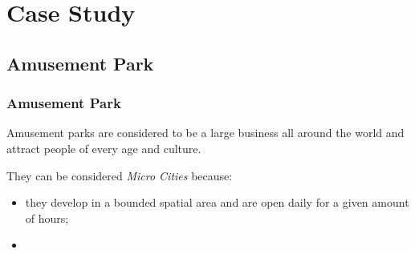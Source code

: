 \section{Case Study}\label{sec:case-study}
\frame{\tableofcontents[currentsection]}

\subsection{Amusement Park}\label{subsec:amusement-park}

\begin{frame}
    \frametitle{Amusement Park}
    Amusement parks are considered to be a large business all around the world and attract people of every age and culture.

    \bigskip

   They can be considered \textit{Micro Cities} because:
    \begin{itemize}
        \item they develop in a bounded spatial area and are open daily for a given amount of hours;
        \item
    \end{itemize}

\end{frame}


